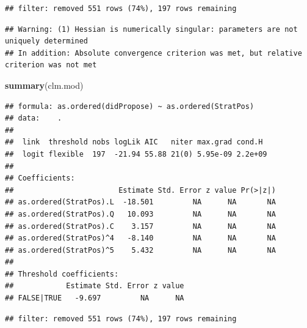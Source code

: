 \documentclass[]{article}
\newenvironment{Shaded}{\begin{snugshade}}{\end{snugshade}}
\newcommand{\CommentTok}[1]{\textcolor[rgb]{0.56,0.35,0.01}{\textit{#1}}}
\newcommand{\DecValTok}[1]{\textcolor[rgb]{0.00,0.00,0.81}{#1}}
\newcommand{\KeywordTok}[1]{\textcolor[rgb]{0.13,0.29,0.53}{\textbf{#1}}}
\newcommand{\NormalTok}[1]{#1}
\newcommand{\OperatorTok}[1]{\textcolor[rgb]{0.81,0.36,0.00}{\textbf{#1}}}
\newcommand{\StringTok}[1]{\textcolor[rgb]{0.31,0.60,0.02}{#1}}
\begin{document}
\begin{verbatim}
## filter: removed 551 rows (74%), 197 rows remaining
\end{verbatim}

\begin{verbatim}
## Warning: (1) Hessian is numerically singular: parameters are not uniquely determined 
## In addition: Absolute convergence criterion was met, but relative criterion was not met
\end{verbatim}

\begin{Shaded}
\begin{Highlighting}[]
\KeywordTok{summary}\NormalTok{(clm.mod)}
\end{Highlighting}
\end{Shaded}

\begin{verbatim}
## formula: as.ordered(didPropose) ~ as.ordered(StratPos)
## data:    .
## 
##  link  threshold nobs logLik AIC   niter max.grad cond.H 
##  logit flexible  197  -21.94 55.88 21(0) 5.95e-09 2.2e+09
## 
## Coefficients:
##                        Estimate Std. Error z value Pr(>|z|)
## as.ordered(StratPos).L  -18.501         NA      NA       NA
## as.ordered(StratPos).Q   10.093         NA      NA       NA
## as.ordered(StratPos).C    3.157         NA      NA       NA
## as.ordered(StratPos)^4   -8.140         NA      NA       NA
## as.ordered(StratPos)^5    5.432         NA      NA       NA
## 
## Threshold coefficients:
##            Estimate Std. Error z value
## FALSE|TRUE   -9.697         NA      NA
\end{verbatim}

\begin{Shaded}
\end{Shaded}

\begin{verbatim}
## filter: removed 551 rows (74%), 197 rows remaining
\end{verbatim}
\end{document}
